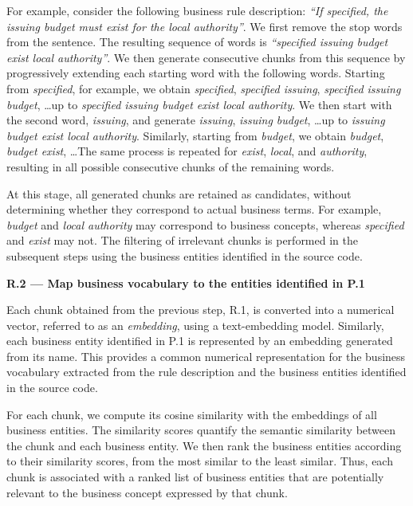 For example, consider the following business rule description: \textit{``If specified, the issuing budget must exist for the local authority''}. We first remove the stop words from the sentence. The resulting sequence of words is \textit{``specified issuing budget exist local authority''}. We then generate consecutive chunks from this sequence by progressively extending each starting word with the following words. Starting from \textit{specified}, for example, we obtain \textit{specified}, \textit{specified issuing}, \textit{specified issuing budget}, \ldots up to \textit{specified issuing budget exist local authority}. We then start with the second word, \textit{issuing}, and generate \textit{issuing}, \textit{issuing budget}, \ldots up to \textit{issuing budget exist local authority}. Similarly, starting from \textit{budget}, we obtain \textit{budget}, \textit{budget exist}, \ldots The same process is repeated for \textit{exist}, \textit{local}, and \textit{authority}, resulting in all possible consecutive chunks of the remaining words.

At this stage, all generated chunks are retained as candidates, without determining whether they correspond to actual business terms. For example, \textit{budget} and \textit{local authority} may correspond to business concepts, whereas \textit{specified} and \textit{exist} may not. The filtering of irrelevant chunks is performed in the subsequent steps using the business entities identified in the source code.

\textbf{R.2 — Map business vocabulary to the entities identified in P.1}

Each chunk obtained from the previous step, R.1, is converted into a numerical vector, referred to as an \textit{embedding}, using a text-embedding model. Similarly, each business entity identified in P.1 is represented by an embedding generated from its name. This provides a common numerical representation for the business vocabulary extracted from the rule description and the business entities identified in the source code.

For each chunk, we compute its cosine similarity with the embeddings of all business entities. The similarity scores quantify the semantic similarity between the chunk and each business entity. We then rank the business entities according to their similarity scores, from the most similar to the least similar. Thus, each chunk is associated with a ranked list of business entities that are potentially relevant to the business concept expressed by that chunk.

